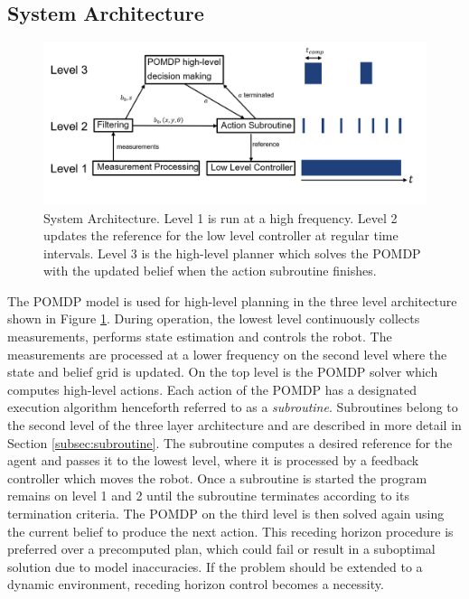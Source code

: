 \subsection{System Architecture}\label{subsec:sysarch}
\begin{figure}
    \centering
    \includegraphics[width=1.0\textwidth]{Report/images/3LevelArchitecture_botha.png}
    \caption{System Architecture. Level 1 is run at a high frequency. Level 2 updates the reference for the low level controller at regular time intervals. Level 3 is the high-level planner which solves the POMDP with the updated belief when the action subroutine finishes. }
    \label{fig:3levelsarchitecture}
\end{figure}
%
The POMDP model is used for high-level planning in the three level architecture shown in Figure \ref{fig:3levelsarchitecture}. During operation, the lowest level continuously collects measurements, performs state estimation and controls the robot. The measurements are processed at a lower frequency on the second level where the state and belief grid is updated. On the top level is the POMDP solver which computes high-level actions. Each action of the POMDP has a designated execution algorithm henceforth referred to as a \emph{subroutine}. Subroutines belong to the second level of the three layer architecture and are described in more detail in Section \ref{subsec:subroutine}. The subroutine computes a desired reference for the agent and passes it to the lowest level, where it is processed by a feedback controller which moves the robot. Once a subroutine is started the program remains on level 1 and 2 until the subroutine terminates according to its termination criteria. The POMDP on the third level is then solved again using the current belief to produce the next action. This receding horizon procedure is preferred over a precomputed plan, which could fail or result in a suboptimal solution due to model inaccuracies. If the problem should be extended to a dynamic environment, receding horizon control becomes a necessity.\\

